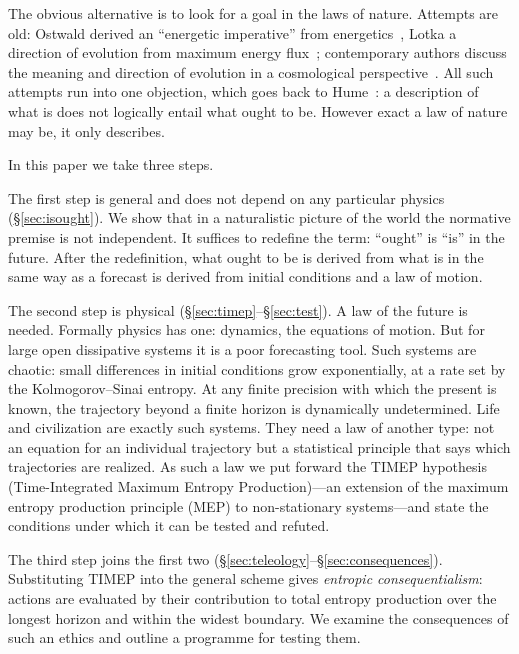 \documentclass[11pt,a4paper]{article}
\newcommand{\Sref}[1]{\hyperref[#1]{\S\ref{#1}}}
\begin{document}
The obvious alternative is to look for a goal in the laws of nature. Attempts are old: Ostwald derived an ``energetic imperative'' from energetics~\cite{ostwald1912}, Lotka a direction of evolution from maximum energy flux~\cite{lotka1922}; contemporary authors discuss the meaning and direction of evolution in a cosmological perspective~\cite{vidal2014,stewart2026}. All such attempts run into one objection, which goes back to Hume~\cite{hume1739}: a description of what is does not logically entail what ought to be. However exact a law of nature may be, it only describes.

In this paper we take three steps.

The first step is general and does not depend on any particular physics (\Sref{sec:isought}). We show that in a naturalistic picture of the world the normative premise is not independent. It suffices to redefine the term: ``ought'' is ``is'' in the future. After the redefinition, what ought to be is derived from what is in the same way as a forecast is derived from initial conditions and a law of motion.

The second step is physical (\Sref{sec:timep}--\Sref{sec:test}). A law of the future is needed. Formally physics has one: dynamics, the equations of motion. But for large open dissipative systems it is a poor forecasting tool. Such systems are chaotic: small differences in initial conditions grow exponentially, at a rate set by the Kolmogorov--Sinai entropy. At any finite precision with which the present is known, the trajectory beyond a finite horizon is dynamically undetermined. Life and civilization are exactly such systems. They need a law of another type: not an equation for an individual trajectory but a statistical principle that says which trajectories are realized. As such a law we put forward the TIMEP hypothesis (Time-Integrated Maximum Entropy Production)---an extension of the maximum entropy production principle (MEP) to non-stationary systems---and state the conditions under which it can be tested and refuted.

The third step joins the first two (\Sref{sec:teleology}--\Sref{sec:consequences}). Substituting TIMEP into the general scheme gives \emph{entropic consequentialism}: actions are evaluated by their contribution to total entropy production over the longest horizon and within the widest boundary. We examine the consequences of such an ethics and outline a programme for testing them.

\end{document}
